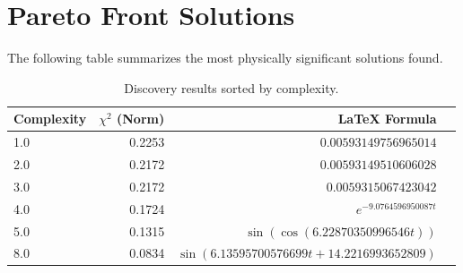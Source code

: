 \documentclass{article}
\begin{document}
\section{Pareto Front Solutions}
The following table summarizes the most physically significant solutions found.

\begin{table}[h!]
\centering
\begin{tabular}{lrrp{8cm}}
\toprule
\textbf{Complexity} & \textbf{$\chi^2$ (Norm)} & \textbf{LaTeX Formula} \\
\midrule
1.0 & 0.2253 & $0.00593149756965014$ \\
2.0 & 0.2172 & $0.00593149510606028$ \\
3.0 & 0.2172 & $0.0059315067423042$ \\
4.0 & 0.1724 & $e^{- 9.0764596950087 t}$ \\
5.0 & 0.1315 & $\sin{\left(\cos{\left(6.22870350996546 t \right)} \right)}$ \\
8.0 & 0.0834 & $\sin{\left(6.13595700576699 t + 14.2216993652809 \right)}$ \\
\bottomrule
\end{tabular}
\caption{Discovery results sorted by complexity.}
\end{table}
\end{document}
